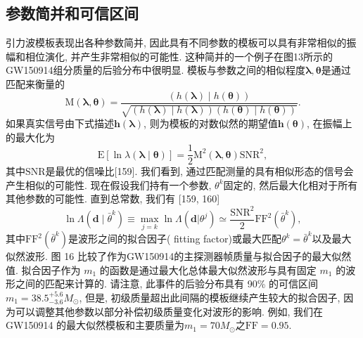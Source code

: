 \documentclass[a4paper]{\documentclassname}
\def\b{\boldsymbol}
\def\t{\text}
\theoremstyle{definition}
\begin{document}
\subsection{参数简并和可信区间}

引力波模板表现出各种参数简并, 因此具有不同参数的模板可以具有非常相似的振幅和相位演化, 并产生非常相似的可能性. 这种简并的一个例子在图13所示的GW150914组分质量的后验分布中很明显. 模板与参数之间的相似程度$\b{\lambda},  \b{\theta}$是通过匹配来衡量的
\begin{equation}
    \t{M}(\b{\lambda},\b{\theta})=\frac{(h(\b{\lambda})\mid h(\b{\theta}))}{\sqrt{(h(\b{\lambda})\mid h(\b{\lambda}))(h(\b{\theta})\mid h(\b{\theta}))}}.
\end{equation}
如果真实信号由下式描述${\b h} (\b{\lambda}) $, 则为模板的对数似然的期望值${\b h} (\b{\theta}) $, 在振幅上的最大化为
\begin{equation}
    \mathrm{E}[\ln\lambda(\b{\lambda}\mid \b{\theta})] = \frac{1}{2}\t{M}^2(\b{\lambda},\b{\theta})\t{SNR}^2,
\end{equation}
其中$\t{SNR}$是最优的信噪比[159]. 我们看到, 通过匹配测量的具有相似形态的信号会产生相似的可能性. 现在假设我们持有一个参数, $\theta^k$固定的, 然后最大化相对于所有其他参数的可能性. 直到总常数, 我们有 [159,  160]
\begin{equation}
    \ln \Lambda(\b{d}\mid\bar{\theta}^k) \equiv \max_{j=k} \ln\Lambda(\b{d}|{\theta}^j) \simeq \frac{\t{SNR}^2}{2}\t{FF}^2(\bar{\theta}^k),
\end{equation}
其中$\t{FF}^2(\bar{\theta}^k)$是波形之间的拟合因子( fitting factor)或最大匹配$\theta^k=\bar{\theta}^k$以及最大似然波形. 图 16 比较了作为GW150914的主探测器帧质量与拟合因子的最大似然值. 拟合因子作为 $m_1$ 的函数是通过最大化总体最大似然波形与具有固定 $m_1$ 的波形之间的匹配来计算的. 请注意, 此事件的后验分布具有 90\%{} 的可信区间$m_1 = 38.5_{-3.6}^{+5.6} M_\odot$, 但是, 初级质量超出此间隔的模板继续产生较大的拟合因子, 因为可以调整其他参数以部分补偿初级质量变化对波形的影响. 例如, 我们在 GW150914 的最大似然模板和主要质量为$m_1=70  M_\odot$之$\t{FF}= 0.95$.
\end{document}
